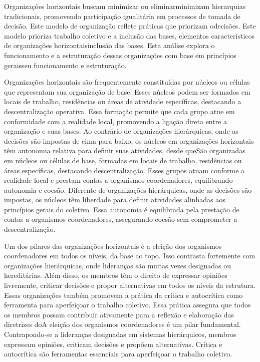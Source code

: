 Organizações horizontais buscam minimizar ou eliminarminimizam
hierarquias tradicionais, promovendo participação igualitária em processos de tomada
de decisão. Este modelo de organização reflete práticas que priorizam
odecisões. Este modelo prioriza trabalho coletivo e a inclusão das bases, elementos
característicos de organizações horizontaisinclusão das bases. Esta análise explora o
funcionamento e a estruturação dessas organizações com base em princípios geraisseu
funcionamento e estruturação. 

Organizações horizontais são frequentemente constituídas por núcleos ou
células que representam sua organização de base. Esses núcleos podem ser formados
em locais de trabalho, residências ou áreas de atividade específicas,
destacando a descentralização operativa. Essa formação permite que cada grupo atue
em conformidade com a realidade local, promovendo a ligação direta entre a
organização e suas bases. Ao contrário de organizações hierárquicas, onde as decisões
são impostas de cima para baixo, os núcleos em organizações horizontais têm
autonomia relativa para definir suas atividades, desde queSão organizadas em
núcleos ou células de base, formadas em locais de trabalho, residências ou áreas
específicas, destacando descentralização. Esses grupos atuam conforme a realidade
local e prestam contas a organismos coordenadores, equilibrando autonomia e
coesão. Diferente de organizações hierárquicas, onde as decisões são impostas, os
núcleos têm liberdade para definir atividades alinhadas aos princípios gerais do
coletivo. Essa autonomia é equilibrada pela prestação de contas a organismos
coordenadores, assegurando coesão sem comprometer a descentralização. 

Um dos pilares das organizações horizontais é a eleição dos organismos
coordenadores em todos os níveis, da base ao topo. Isso contrasta fortemente com
organizações hierárquicas, onde lideranças são muitas vezes designadas ou
hereditárias. Além disso, os membros têm o direito de expressar opiniões livremente,
criticar decisões e propor alternativas em todos os níveis da estrutura. Essas
organizações também promovem a prática da crítica e autocrítica como ferramenta para
aperfeiçoar o trabalho coletivo. Essa prática assegura que todos os membros possam
contribuir ativamente para a reflexão e elaboração das diretrizes doA eleição dos
organismos coordenadores é um pilar fundamental. Contrapondo-se a lideranças
designadas em sistemas hierárquicos, membros expressam opiniões, criticam decisões e
propõem alternativas. Crítica e autocrítica são ferramentas essenciais para
aperfeiçoar o trabalho coletivo. 

